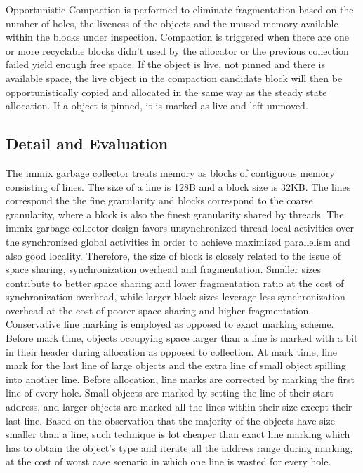 \documentclass{article}
\begin{document}
  Opportunistic Compaction is performed to eliminate fragmentation based on the
  number of holes, the liveness of the objects and the unused memory available
  within the blocks under inspection. Compaction is triggered when there are one
  or more recyclable blocks didn't used by the allocator or the previous
  collection failed yield enough free space. If the object is live, not pinned
  and there is available space, the live object in the compaction candidate
  block will then be opportunistically copied and allocated in the same way as
  the steady state allocation. If a object is pinned, it is marked as live and
  left unmoved.

  \subsection{Detail and Evaluation}
  The immix garbage collector treats memory as blocks of contiguous memory
  consisting of lines. The size of a line is 128B and a block size is 32KB. The
  lines correspond the the fine granularity and blocks correspond to the coarse
  granularity, where a block is also the finest granularity shared by threads.
  The immix garbage collector design favors unsynchronized thread-local
  activities over the synchronized global activities in order to achieve
  maximized parallelism and also good locality. Therefore, the size of block is
  closely related to the issue of space sharing, synchronization overhead and
  fragmentation. Smaller sizes contribute to better space sharing and lower
  fragmentation ratio at the cost of synchronization overhead, while larger
  block sizes leverage less synchronization overhead at the cost of poorer space
  sharing and higher fragmentation. \\

  Conservative line marking is employed as opposed to exact marking scheme.
  Before mark time, objects occupying space larger than a line is marked with a
  bit in their header during allocation as opposed to collection. At mark time,
  line mark for the last line of large objects and the extra line of small
  object spilling into another line. Before allocation, line marks are corrected
  by marking the first line of every hole. Small objects are marked by setting
  the line of their start address, and larger objects are marked all the lines
  within their size except their last line. Based on the observation that the
  majority of the objects have size smaller than a line, such technique is lot
  cheaper than exact line marking which has to obtain the object's type and
  iterate all the address range during marking, at the cost of worst case
  scenario in which one line is wasted for every hole.
\end{document}
